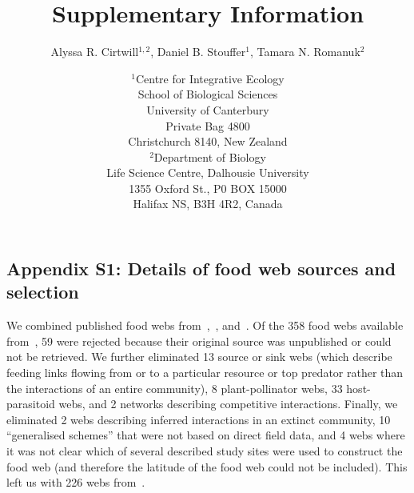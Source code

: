 \documentclass[12pt]{article}
\newcommand{\beginsupplement}{%
        \setcounter{table}{0}
        \renewcommand{\thetable}{S\arabic{table}}%
        \setcounter{figure}{0}
        \renewcommand{\thefigure}{S\arabic{figure}}%
     }
\begin{document}
\title{Supplementary Information}
\author{Alyssa R. Cirtwill$^{1,2}$, Daniel B. Stouffer$^{1}$, Tamara N. Romanuk$^{2}$}
\date{\footnotesize$^1$Centre for Integrative Ecology\\School of Biological Sciences\\University of Canterbury\\
Private Bag 4800\\Christchurch 8140, New Zealand \\
\medskip$^2$Department of Biology\\
Life Science Centre, Dalhousie University\\1355 Oxford St., P0 BOX 15000\\
Halifax NS, B3H 4R2, Canada\\}



\maketitle
\baselineskip=8.5mm

\vspace{0.4 in}
\beginsupplement
\linenumbers

\subsection*{Appendix S1: Details of food web sources and selection}

  We combined published food webs from~\cite{GlobalWeb},~\cite{Riede2011},
  and~\cite{Dunne2013}. Of the 358 food webs available
  from~\cite{GlobalWeb}, 59 were rejected because their original source was
  unpublished or could not be retrieved. We further eliminated 13 source or
  sink webs (which describe feeding links flowing from or to a particular
  resource or top predator rather than the interactions of an entire
  community), 8 plant-pollinator webs, 33 host-parasitoid webs, and 2 networks
  describing competitive interactions. Finally, we eliminated 2 webs
  describing  inferred interactions in an extinct community, 10 ``generalised
  schemes'' that were not based on direct field data, and 4 webs where it was
  not clear which of several described study sites were used to construct the
  food web (and therefore the latitude of the food web could not be
  included). This left us with 226 webs from~\cite{GlobalWeb}.
\end{document}
